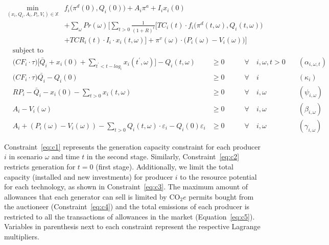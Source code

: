 \documentclass[11pt, letterpaper]{article}
\begin{document}
\small
\begin{align}
\min_{(x_i,Q_i,A_i,P_i,V_i)\in \mathbb{X}}  & f_i \big( \pi^d(0),Q_i(0)\big)+ A_i \pi^{a} + I_i x_i(0) \nonumber \\ 
& + \sum_{\omega} Pr(\omega)   \Bigg[ \sum_{t>0} \frac{1}{(1+R)^t} \Big[ TC_i(t)\cdot f_i \big( \pi^d(t,\omega),Q_i(t,\omega) \big) \nonumber\\
&  + TCR_i(t) \cdot I_i\cdot x_i(t,\omega) \Big] + \pi^v(\omega)\cdot \big(P_i(\omega)-V_i(\omega)\big) \Bigg]   \label{eq:prod}
\end{align}
\begin{align}
&\textrm{subject to \ } \nonumber\\
    &\Big(CF_i \cdot\tau\Big)  \Bigg[\bar{Q}_i + x_i(0)+\sum_{t^{\prime}<t-lag_i} x_i(t^\prime,\omega) \Bigg] - Q_i(t,\omega) & \geq 0  & \qquad \forall \quad i,\omega, t  > 0   & \quad (\alpha_{i,\omega,t})      \label{eq:c1}\\
    &\Big(CF_i\cdot\tau \Big)\bar{Q_i}-Q_{i}(0)                                                                                 & \geq 0  & \qquad \forall \quad i                  &  \quad (\kappa_i) \label{eq:c2} \\
    &RP_i - \bar{Q}_i - x_i(0) - \sum_{t > 0} x_i(t,\omega)                                                                     & \geq 0  & \qquad \forall \quad i,\omega           &   \quad (\psi_{i,\omega})\label{eq:c3} \\
    &A_{i} -V_i(\omega)                                                                                                         & \geq  0 & \qquad \forall \quad i,\omega           & \quad (\beta_{i,\omega}) \label{eq:c4}\\
    &A_{i} + (P_i(\omega) - V_i(\omega))-\sum_{t>0}Q_i(t, \omega)\cdot \varepsilon_{i}-Q_i(0)\varepsilon_{i}           & \geq  0 & \qquad \forall \quad i, \omega          & \quad (\gamma_{i,\omega}) \label{eq:c5}
  \end{align}
\normalsize

Constraint~\ref{eq:c1} represents the generation capacity constraint for each producer $i$ in scenario $\omega$ and time $t$ in the second stage. Similarly, Constraint~\ref{eq:c2} restricts generation for $t=0$ (first stage). Additionally, we limit the total capacity (installed and new investments) for producer $i$ to the resource potential for each technology, as shown in Constraint~\ref{eq:c3}. The maximum amount of allowances that each generator can sell is limited by CO$_2e$ permits bought from the auctioneer (Constraint~\ref{eq:c4}) and the total emissions of each producer is restricted to all the transactions of allowances in the market (Equation~\ref{eq:c5}). Variables in parenthesis next to each constraint represent the respective Lagrange multipliers.
\end{document}

